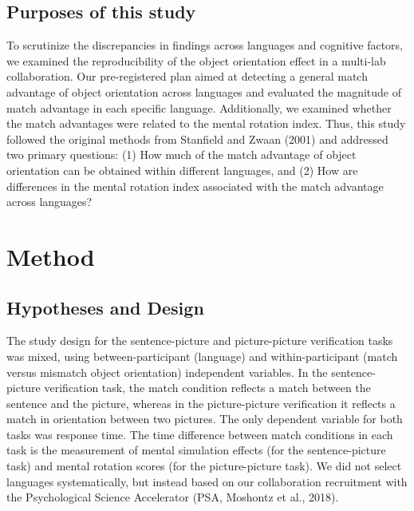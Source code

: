 \documentclass[
  man,floatsintext]{apa7}
\begin{document}
\hypertarget{purposes-of-this-study}{%
\subsection{Purposes of this study}\label{purposes-of-this-study}}

To scrutinize the discrepancies in findings across languages and
cognitive factors, we examined the reproducibility of the object
orientation effect in a multi-lab collaboration. Our pre-registered plan
aimed at detecting a general match advantage of object orientation
across languages and evaluated the magnitude of match advantage in each
specific language. Additionally, we examined whether the match
advantages were related to the mental rotation index. Thus, this study
followed the original methods from Stanfield and Zwaan (2001) and addressed
two primary questions: (1) How much of the match advantage of object
orientation can be obtained within different languages, and (2) How are
differences in the mental rotation index associated with the match
advantage across languages?

\hypertarget{method}{%
\section{Method}\label{method}}

\hypertarget{hypotheses-and-design}{%
\subsection{Hypotheses and Design}\label{hypotheses-and-design}}

The study design for the sentence-picture and picture-picture
verification tasks was mixed, using between-participant (language) and
within-participant (match versus mismatch object orientation)
independent variables. In the sentence-picture verification task, the
match condition reflects a match between the sentence and the picture,
whereas in the picture-picture verification it reflects a match in
orientation between two pictures. The only dependent variable for both
tasks was response time. The time difference between match conditions in each task is the measurement of mental simulation effects (for the
sentence-picture task) and mental rotation scores (for the
picture-picture task). We did not select languages systematically, but
instead based on our collaboration recruitment with the Psychological
Science Accelerator (PSA, Moshontz et al., 2018).
\end{document}
